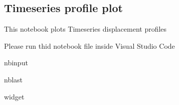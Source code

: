 \documentclass[letterpaper,10pt]{sphinxmanual}
\begin{document}
\sphinxstepscope


\subsection{Time\sphinxhyphen{}series profile plot}
\label{\detokenize{notebooks/akhdefo_ts_plot:Time-series-profile-plot}}\label{\detokenize{notebooks/akhdefo_ts_plot::doc}}
\sphinxAtStartPar
This notebook plots Time\sphinxhyphen{}series displacement profiles

\sphinxAtStartPar
{}

\sphinxAtStartPar
Please run thid notebook file inside Visual Studio Code

\begin{sphinxuseclass}{nbinput}
\begin{sphinxuseclass}{nblast}
{
\begin{sphinxVerbatim}[commandchars=\\\{\}]
\llap{\color{nbsphinxin}[1]:\,\hspace{\fboxrule}\hspace{\fboxsep}} widget
    

\end{sphinxVerbatim}
}

\end{sphinxuseclass}
\end{sphinxuseclass}
\end{document}
